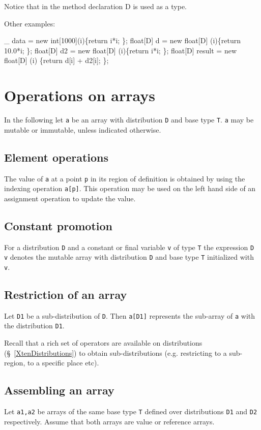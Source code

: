 Notice that in the method declaration {\cf D} is used as a type. 

Other examples:
\begin{x10}
\_ data = new int[1000](i)\{return i*i; \};
float[D] d = new float[D] (i)\{return 10.0*i; \}; 
float[D] d2 = new float[D] (i)\{return i*i; \};
float[D] result = new float[D] 
      (i) \{return d[i] + d2[i]; \};
\end{x10}

\section{Operations on arrays}
In the following let {\tt a} be an array with distribution {\tt D} and
base type {\tt T}. {\tt a} may be mutable or immutable, unless
indicated otherwise.

\subsection{Element operations}
The value of {\tt a} at a point {\tt p} in its region of definition is
obtained by using the indexing operation {\tt a[p]}. This operation
may be used on the left hand side of an assignment operation to update
the value.

\subsection{Constant promotion}\label{ConstantArray}

For a distribution {\tt D} and a constant or final variable {\tt v} of
type {\tt T} the expression {\tt D v} denotes the mutable array with
distribution {\tt D} and base type {\tt T} initialized with {\tt v}.

\subsection{Restriction of an array}

Let {\tt D1} be a sub-distribution of {\tt D}. Then {\tt a[D1]}
represents the sub-array of {\tt a} with the distribution {\tt D1}.

Recall that a rich set of operators are available on distributions
(\S~\ref{XtenDistributions}) to obtain sub-distributions
(e.g. restricting to a sub-region, to a specific place etc).

\subsection{Assembling an array}
Let {\tt a1,a2} be arrays of the same base type {\tt T} defined over
distributions {\tt D1} and {\tt D2} respectively. Assume that both
arrays are value or reference arrays. 
